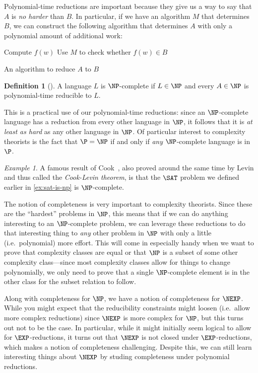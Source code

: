 \documentclass[english,12pt]{reedthesis}
\theoremstyle{plain}
\theoremstyle{definition}
\newtheorem{defn}[defn]{Definition}
\theoremstyle{remark}
\newtheorem{example}{Example}[thm]
\begin{document}
Polynomial-time reductions are important because they give us a way to say that
$A$ is \emph{no harder} than $B$. In particular, if we have an algorithm $M$
that determines $B$, we can construct the following algorithm that determines
$A$ with only a polynomial amount of additional work:

\begin{algorithm}[H]
  Compute $f(w)$\;
  Use $M$ to check whether $f(w) \in B$\;
  \;
  \caption{An algorithm to reduce $A$ to $B$}
\end{algorithm}

\begin{defn}[{\cite[Def.\ 7.34]{Sip97}}]\label{def:np-complete}
  A language $L$ is $\NP$-complete if $L \in \NP$ and every $A \in \NP$ is
  polynomial-time reducible to $L$.
\end{defn}

This is a practical use of our polynomial-time reductions: since an
$\NP$-complete language has a reduction from every other language in $\NP$, it
follows that it is \emph{at least as hard} as any other language in $\NP$. Of
particular interest to complexity theorists is the fact that $\P = \NP$ if and
only if \emph{any} $\NP$-complete language is in $\P$.

\begin{example}\label{ex:sat-is-complete}
  A famous result of Cook~\cite{Cook71}, also proved around the same time by
  Levin and thus called the \emph{Cook-Levin theorem}, is that the $\SAT$
  problem we defined earlier in \cref{ex:sat-is-np} is $\NP$-complete.
\end{example}

The notion of completeness is very important to complexity theorists. Since
these are the ``hardest'' problems in $\NP$, this means that if we can do
anything interesting to an $\NP$-complete problem, we can leverage these
reductions to do that interesting thing to \emph{any} other problem in $\NP$
with only a little (i.e.\ polynomial) more effort. This will come in especially
handy when we want to prove that complexity classes are equal or that $\NP$ is a
subset of some other complexity class---since most complexity classes allow for
things to change polynomially, we only need to prove that a single
$\NP$-complete element is in the other class for the subset relation to follow.

Along with completeness for $\NP$, we have a notion of completeness for $\NEXP$.
While you might expect that the reducibility constraints might loosen (i.e.\
allow more complex reductions) since $\NEXP$ is more complex for $\NP$, but this
turns out not to be the case. In particular, while it might initially seem
logical to allow for $\EXP$-reductions, it turns out that $\NEXP$ is not closed
under $\EXP$-reductions, which makes a notion of completeness challenging.
Despite this, we can still learn interesting things about $\NEXP$ by studing
completeness under polynomial reductions.
\end{document}
